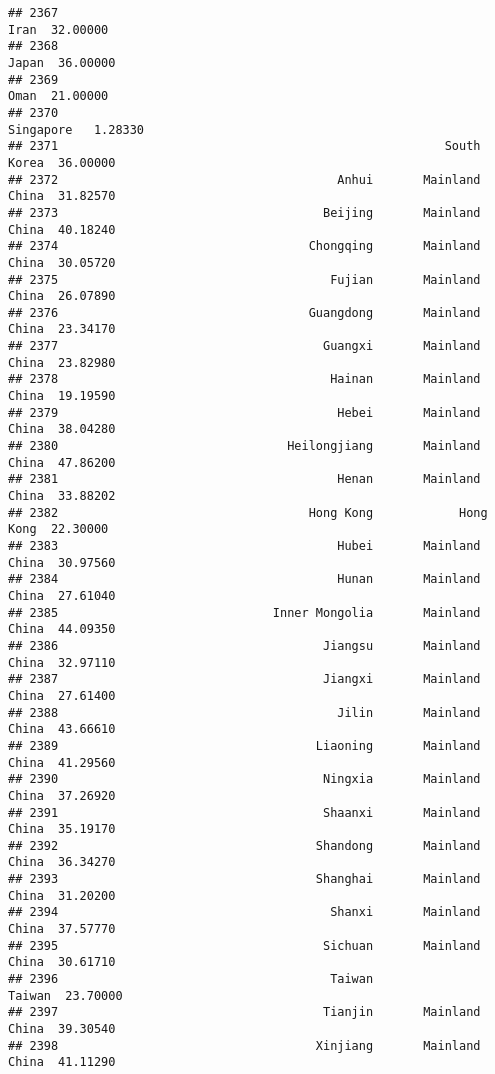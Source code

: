 \documentclass[
]{article}
\begin{document}
\begin{verbatim}
## 2367                                                             Iran  32.00000
## 2368                                                            Japan  36.00000
## 2369                                                             Oman  21.00000
## 2370                                                        Singapore   1.28330
## 2371                                                      South Korea  36.00000
## 2372                                       Anhui       Mainland China  31.82570
## 2373                                     Beijing       Mainland China  40.18240
## 2374                                   Chongqing       Mainland China  30.05720
## 2375                                      Fujian       Mainland China  26.07890
## 2376                                   Guangdong       Mainland China  23.34170
## 2377                                     Guangxi       Mainland China  23.82980
## 2378                                      Hainan       Mainland China  19.19590
## 2379                                       Hebei       Mainland China  38.04280
## 2380                                Heilongjiang       Mainland China  47.86200
## 2381                                       Henan       Mainland China  33.88202
## 2382                                   Hong Kong            Hong Kong  22.30000
## 2383                                       Hubei       Mainland China  30.97560
## 2384                                       Hunan       Mainland China  27.61040
## 2385                              Inner Mongolia       Mainland China  44.09350
## 2386                                     Jiangsu       Mainland China  32.97110
## 2387                                     Jiangxi       Mainland China  27.61400
## 2388                                       Jilin       Mainland China  43.66610
## 2389                                    Liaoning       Mainland China  41.29560
## 2390                                     Ningxia       Mainland China  37.26920
## 2391                                     Shaanxi       Mainland China  35.19170
## 2392                                    Shandong       Mainland China  36.34270
## 2393                                    Shanghai       Mainland China  31.20200
## 2394                                      Shanxi       Mainland China  37.57770
## 2395                                     Sichuan       Mainland China  30.61710
## 2396                                      Taiwan               Taiwan  23.70000
## 2397                                     Tianjin       Mainland China  39.30540
## 2398                                    Xinjiang       Mainland China  41.11290

\end{verbatim}
\end{document}
